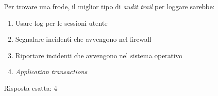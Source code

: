 \begin{Exercise} [
  title={Quiz},
  label={esSFDP7}
  ]

  \Question Per trovare una frode, il miglior tipo di \textit{audit trail} per 
loggare sarebbe:
\begin{enumerate}
 \item Usare log per le sessioni utente
 \item Segnalare incidenti che avvengono nel firewall
 \item Riportare incidenti che avvengono nel sistema operativo
 \item \textit{Application transactions}
\end{enumerate}
  
\end{Exercise}

\begin{Answer} [
  ref={esSFDP7},
  number={7}
  ]

  \Question Risposta esatta: 4
\end{Answer}
